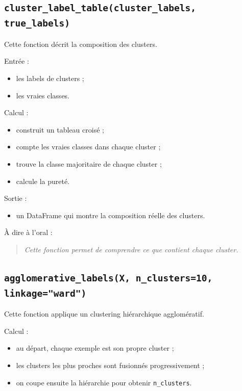 \documentclass[11pt,a4paper]{article}
\begin{document}
\subsection{\texttt{cluster\_label\_table(cluster\_labels, true\_labels)}}

Cette fonction décrit la composition des clusters.

Entrée :

\begin{itemize}
\item les labels de clusters ;
\item les vraies classes.
\end{itemize}

Calcul :

\begin{itemize}
\item construit un tableau croisé ;
\item compte les vraies classes dans chaque cluster ;
\item trouve la classe majoritaire de chaque cluster ;
\item calcule la pureté.
\end{itemize}

Sortie :

\begin{itemize}
\item un DataFrame qui montre la composition réelle des clusters.
\end{itemize}

À dire à l'oral :

\begin{quote}
\itshape Cette fonction permet de comprendre ce que contient chaque cluster.
\end{quote}

\subsection{\texttt{agglomerative\_labels(X, n\_clusters=10, linkage="ward")}}

Cette fonction applique un clustering hiérarchique agglomératif.

Calcul :

\begin{itemize}
\item au départ, chaque exemple est son propre cluster ;
\item les clusters les plus proches sont fusionnés progressivement ;
\item on coupe ensuite la hiérarchie pour obtenir \texttt{n\_clusters}.
\end{itemize}
\end{document}
